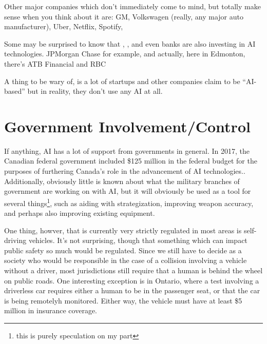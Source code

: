 \documentclass[letterpaper,12pt]{article}
\begin{document}
Other major companies which don't immediately come to mind, but totally make sense when you think about it are:
GM,
Volkswagen (really, any major auto manufacturer),
Uber,
Netflix,
Spotify,

Some may be surprised to know that , , and even banks are also investing in AI technologies.
JPMorgan Chase for example, and actually, here in Edmonton, there's ATB Financial and RBC

A thing to be wary of, is a lot of startups and other companies claim to be ``AI-based''
but in reality, they don't use any AI at all. \cite{}


\section{Government Involvement/Control}
If anything, AI has a lot of support from governments in general.
In 2017, the Canadian federal government included \$125 million in the
federal budget for the purposes of furthering Canada's role in the
advancement of AI technologies.\cite{canadafederalfunding}. 
Additionally, obviously little is known about what the military
branches of government are working on with AI, but it will obviously
be used as a tool for several things\footnote{this is purely speculation on my part},
such as aiding with 
strategization, improving weapon accuracy, and perhaps also improving
existing equipment.

One thing, howver, that is currently very strictly regulated
in most areas is self-driving vehicles. It's not surprising,
though that something which can impact public safety so much
would be regulated. Since we still have to decide as a society
who would be responsible in the case of a collision
involving a vehicle without a driver, most
jurisdictions still require that a human is behind the wheel on public roads.
One interesting exception is in Ontario, where a test involving a driverless car
requires either a human to be in the passenger seat, or that the car is being
remotelyh monitored. Either way, the vehicle must have at least \$5 million
in insurance coverage.\cite{ontariodriverless}
\end{document}
